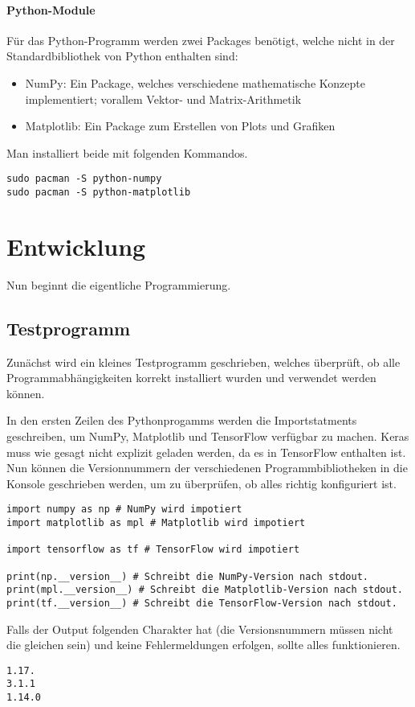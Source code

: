 \paragraph{Python-Module}

Für das Python-Programm werden zwei Packages benötigt, welche
nicht in der Standardbibliothek von Python enthalten sind:
\begin{itemize}
\item{NumPy: Ein Package, welches verschiedene mathematische Konzepte
    implementiert; vorallem Vektor- und Matrix-Arithmetik}
\item{Matplotlib: Ein Package zum Erstellen von Plots und Grafiken}
\end{itemize}

Man installiert beide mit folgenden Kommandos.
\begin{verbatim}
sudo pacman -S python-numpy
sudo pacman -S python-matplotlib
\end{verbatim}

\section{Entwicklung}
Nun beginnt die eigentliche Programmierung.

\subsection{Testprogramm}
Zunächst wird ein kleines Testprogramm geschrieben, welches überprüft, ob
alle Programmabhängigkeiten korrekt installiert wurden und verwendet werden können.

In den ersten Zeilen des Pythonprogamms werden die Importstatments
geschreiben, um NumPy, Matplotlib und TensorFlow verfügbar zu machen.
Keras muss wie gesagt nicht explizit geladen werden, da es in TensorFlow
enthalten ist.
Nun können die Versionnummern der verschiedenen Programmbibliotheken
in die Konsole geschrieben werden, um zu überprüfen, ob alles richtig konfiguriert ist.
\begin{verbatim}
import numpy as np # NumPy wird impotiert
import matplotlib as mpl # Matplotlib wird impotiert

import tensorflow as tf # TensorFlow wird impotiert

print(np.__version__) # Schreibt die NumPy-Version nach stdout.
print(mpl.__version__) # Schreibt die Matplotlib-Version nach stdout.
print(tf.__version__) # Schreibt die TensorFlow-Version nach stdout.
\end{verbatim}
Falls der Output folgenden Charakter hat (die Versionsnummern müssen nicht
die gleichen sein) und keine Fehlermeldungen erfolgen, sollte alles funktionieren.
\begin{verbatim}
1.17.
3.1.1
1.14.0
\end{verbatim}
\para{}

